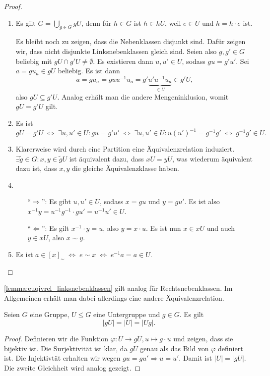 \begin{proof}{\ }
    \begin{enumerate}
        \item Es gilt $G = \bigcup_{g \in G} gU$, denn für $h \in G$ ist $h \in hU$, weil $e \in U$ und $h = h \cdot e$ ist. 
        
        Es bleibt noch zu zeigen, dass die Nebenklassen disjunkt sind. Dafür zeigen wir, dass nicht disjunkte Linksnebenklassen gleich sind. Seien also $g, g' \in G$ beliebig mit $gU \cap g'U \not= \emptyset$. Es existieren dann $u, u' \in U$, sodass $g u = g' u'$. Sei $a = g  u_a \in gU$ beliebig. Es ist dann $$ a = g u_a = g u u^{-1} u_a = g' \underbrace{u' u^{-1} u_a}_{\in U} \in g'U, $$
        also $gU \subseteq g'U$. Analog erhält man die andere Mengeninklusion, womit $gU = g'U$ gilt.
        \item Es ist 
        $$gU = g'U \;\Leftrightarrow\; \exists u, u' \in U: gu = g'u' \;\Leftrightarrow\; \exists u, u' \in U: u\left(u'\right)^{-1} = g^{-1}g' \;\Leftrightarrow\; g^{-1}g' \in U.$$
        \item Klarerweise wird durch eine Partition eine Äquivalenzrelation induziert. $\exists \tilde{g} \in G: x,y \in \tilde{g}U$ ist äquivalent dazu, dass $xU = yU$, was wiederum äquivalent dazu ist, dass $x, y$ die gleiche Äquivalenzklasse haben.
        \item \begin{itemize}[leftmargin=1cm]
            \item[``$\Rightarrow$'':] Es gibt $u, u' \in U$, sodass $x = g u$ und $y = g u'$. Es ist also $x^{-1} y = u^{-1} g^{-1} \cdot g  u' = u^{-1} u' \in U$.
            \item[``$\Leftarrow$'':] Es gilt $x^{-1}\cdot y = u$, also $y = x\cdot u$.  Es ist nun $x \in xU$ und auch  $y \in xU$, also $x \sim y$. 
        \end{itemize}
        \item Es ist $a \in [x]_\sim \;\Leftrightarrow\; e \sim x \;\Leftrightarrow\; e^{-1} a = a \in U $.
    \end{enumerate}
\end{proof}

\begin{remark}
    \cref{lemma:euqivrel_linksnebenklassen} gilt analog für Rechtsnebenklassen. Im Allgemeinen erhält man dabei allerdings eine andere Äquivalenzrelation.
\end{remark}

\begin{lemma}
    Seien $G$ eine Gruppe, $U \le G$ eine Untergruppe und $g \in G$. Es gilt $$\vert gU \vert = \vert U \vert = \vert Ug \vert.$$
\end{lemma}
\begin{proof}
    Definieren wir die Funktion $\varphi: U \to gU, u \mapsto g\cdot u$ und zeigen, dass sie bijektiv ist. Die Surjektivität ist klar, da $gU$ genau als das Bild von $\varphi$ definiert ist. Die Injektivtät erhalten wir wegen $gu = gu' \Rightarrow u = u'$. Damit ist $\vert U \vert = \vert gU \vert$. Die zweite Gleichheit wird analog gezeigt.
\end{proof}

